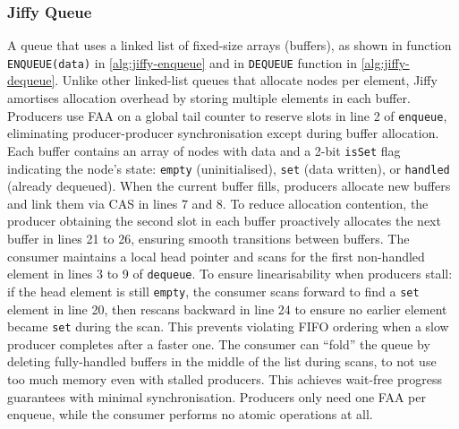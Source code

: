 \subsubsection{Jiffy Queue}\label{subsubsec:jiffy-mpsc-queue}
A queue that uses a linked list of fixed-size arrays (buffers), as shown in function \newline \texttt{ENQUEUE(data)} in \cref{alg:jiffy-enqueue} and in \texttt{DEQUEUE} function in \cref{alg:jiffy-dequeue}. Unlike other linked-list queues that allocate nodes per element, Jiffy amortises allocation overhead by storing multiple elements in each buffer. Producers use \ac{FAA} on a global tail counter to reserve slots in line 2 of \texttt{enqueue}, eliminating producer-producer synchronisation except during buffer allocation. Each buffer contains an array of nodes with data and a 2-bit \texttt{isSet} flag indicating the node's state: \texttt{empty} (uninitialised), \texttt{set} (data written), or \texttt{handled} (already dequeued). When the current buffer fills, producers allocate new buffers and link them via \ac{CAS} in lines 7 and 8. To reduce allocation contention, the producer obtaining the second slot in each buffer proactively allocates the next buffer in lines 21 to 26, ensuring smooth transitions between buffers. The consumer maintains a local head pointer and scans for the first non-handled element in lines 3 to 9 of \texttt{dequeue}. To ensure linearisability when producers stall: if the head element is still \texttt{empty}, the consumer scans forward to find a \texttt{set} element in line 20, then rescans backward in line 24 to ensure no earlier element became \texttt{set} during the scan. This prevents violating FIFO ordering when a slow producer completes after a faster one. The consumer can ``fold'' the queue by deleting fully-handled buffers in the middle of the list during scans, to not use too much memory even with stalled producers. This achieves wait-free progress guarantees with minimal synchronisation. Producers only need one \ac{FAA} per enqueue, while the consumer performs no atomic operations at all. \cite{jiffy}

